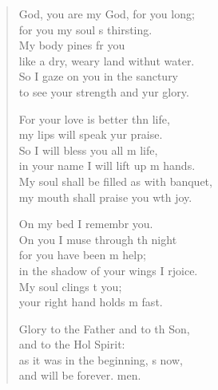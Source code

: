 \settowidth{\versewidth}{My soul shall be filled as with a banquet,    *}
\begin{verse}%
  \begin{patverse}
     God, you are my God, for you  long;\Med\\
for you my soul \pointup{\i}s thirsting.\\
My body pines fr you\Med\\
like a dry, weary land withut water.\\
So I gaze on you in the sanctury\Med\\
to see your strength and yur glory.

For your love is better thn life,\Med\\
my lips will speak yur praise.\\
So I will bless you all m life,\Med\\
in your name I will lift up m hands.\\
My soul shall be filled as with  banquet,\Med\\
my mouth shall praise you w\pointup{\i}th joy.

On my bed I remembr you.\Med\\
On you I muse through th night\\
for you have been m help;\Med\\
in the shadow of your wings I rjoice.\\
My soul clings t you;\Med\\
your right hand holds m fast.

Glory to the Father and to th Son,\Med\\
and to the Hol Spirit:\\
as it was in the beginning, \pointup{\i}s now,\Med\\
and will be forever. men.
  \end{patverse}
\end{verse}
